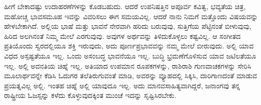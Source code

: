 \newpage

ಹೀಗೆ ಬೇಕಾದಷ್ಟು ಉದಾಹರಣೆಗಳನ್ನು ಕೊಡಬಹುದು. ಆದರೆ ಉಪ\-ನಿಷತ್ತಿನ ಅಪೂರ್ವ ಕವಿತ್ವ, ಭವ್ಯತೆಯ ಚಿತ್ರ, ಮಹೋಚ್ಚ ಭಾವಸಮೂಹ ಇವನ್ನು ವಿವರಿಸಲು ಈಗ ಸಮಯವಿಲ್ಲ. ಆದರೆ ನಾನು ನಿಮಗೆ ಮತ್ತೊಂದು ವಿಷಯವನ್ನು ಹೇಳಬೇಕಾಗಿದೆ. ಅಲ್ಲಿಯ ಭಾಷೆ ಮತ್ತು ಭಾವನೆ ನೇರವಾಗಿ ಹರಿದು ಬರುವುವು, ಸುತ್ತಿಗೆಯ ಪೆಟ್ಟಿನಂತೆ ಬೀಳುವುವು, ಹಿರಿದ ಅಲಗಿನಂತೆ ನಿಮ್ಮ ಮೇಲೆ ಎರಗುವುವು. ಅವುಗಳ ಅರ್ಥವನ್ನು ತಿಳಿದುಕೊಳ್ಳಲು ಕಷ್ಟವಿಲ್ಲ. ಆ ಸಂಗೀತದ ಪ್ರತಿಯೊಂದು ಸ್ವರದಲ್ಲಿಯೂ ಶಕ್ತಿ ಇರುವುದು, ಅದು ಪೂರ್ಣಪ್ರಭಾವವನ್ನು ನಮ್ಮ ಮೇಲೆ ಬೀರುವುದು. ಅಲ್ಲಿ ಯಾವ ವಿಧದ ಅಸ್ಪಷ್ಟತೆಯೂ ಇಲ್ಲ. ಒಂದು ಅಸಂಬದ್ಧ ಭಾವನೆಯೂ ಇಲ್ಲ. ಬುದ್ಧಿ ಭ್ರಮಣೆಗೊಳಿಸುವ ಯಾವ ಜಟಿಲತೆಯೂ ಇಲ್ಲ. ಅಲ್ಲಿ ಅವನತಿಯ ಚಿಹ್ನೆ ಇಲ್ಲ. ಅತಿಯಾದ ಉಪಮಾನ ರೂಪಕಗಳನ್ನು, ರಾಶಿರಾಶಿ ಗುಣವಾಚಕಗಳನ್ನು ಸೇರಿಸಿ ಮೂಲಾರ್ಥವನ್ನೇ ಕೆಡಿಸಿ ಓದುಗರ ತಲೆತಿರುಗುವಂತೆ ಮಾಡಿ, ಅವರನ್ನು ವ್ಯೂಹದಲ್ಲಿ ಸಿಕ್ಕಿಸಿ, ದಾರಿಗಾಣದಂತೆ ಮಾಡುವ ಪ್ರಯತ್ನವಿಲ್ಲ ಅಲ್ಲಿ. ಇಂತಹ ಚಿಹ್ನೆ ಅಲ್ಲಿ ಯಾವುದೂ ಇಲ್ಲ. ಅದು ಮಾನವಸಾಹಿತ್ಯವಾಗಿದ್ದರೆ, ಜನಾಂಗವು ತನ್ನ ರಾಷ್ಟ್ರೀಯ ಓಜಸ್ಸನ್ನು ಕಳೆದು ಕೊಳ್ಳುವುದಕ್ಕಿಂತ ಮುಂಚೆ ಇದನ್ನು ಸೃಷ್ಟಿಸಿರಬೇಕು.

